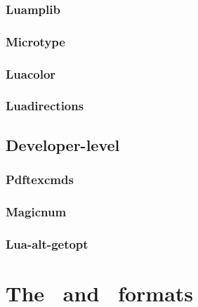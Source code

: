 \documentclass{lltxdoc}
\begin{document}
\subsubsection{Luamplib}

\subsubsection{Microtype}

\subsubsection{Luacolor}

\subsubsection{Luadirections}

\subsection{Developer-level}

\subsubsection{Pdftexcmds}

\subsubsection{Magicnum}

\subsubsection{Lua-alt-getopt}

\section{The \luatex\ and \lualatex\ formats}
\end{document}
